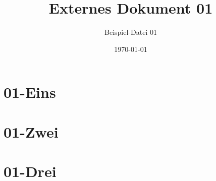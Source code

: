 \documentclass[12pt, headings=small]{scrreprt}
\title{Externes Dokument 01}
\subtitle{Beispiel-Datei 01}
\author{}
\date{\today}
\begin{document}
\maketitle
\tableofcontents
  \chapter{01-Eins}
		\label{cha:Eins}
		\blindtext[2]

		\blindtext[2]

	\chapter{01-Zwei}
		\label{cha:Zwei}
		\blindtext[2]
		
		\blindtext[2]
	\chapter{01-Drei}
		\label{cha:Drei}
		\blindtext[2]
		
		\blindtext[2]
\end{document}
